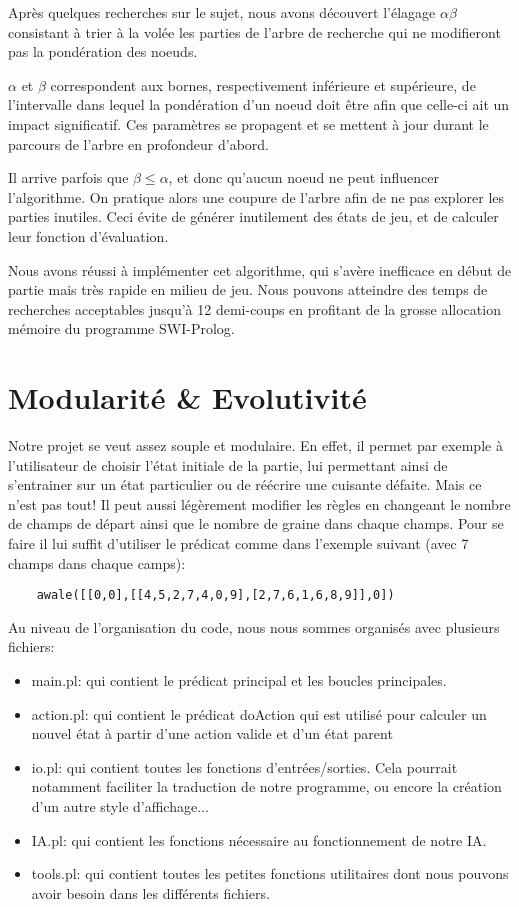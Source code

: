 \documentclass[]{article}
\begin{document}
Après quelques recherches sur le sujet, nous avons découvert l'élagage $\alpha\beta$ consistant à trier à la volée les parties de l'arbre de recherche qui ne modifieront pas la pondération des noeuds.

$\alpha$ et $\beta$ correspondent aux bornes, respectivement inférieure et supérieure, de l'intervalle dans lequel la pondération d'un noeud doit être afin que celle-ci ait un impact significatif. Ces paramètres se propagent et se mettent à jour durant le parcours de l'arbre en profondeur d'abord.

Il arrive parfois que $\beta \leq \alpha$, et donc qu'aucun noeud ne peut influencer l'algorithme. On pratique alors une coupure de l'arbre afin de ne pas explorer les parties inutiles. Ceci évite de générer inutilement des états de jeu, et de calculer leur fonction d'évaluation.

Nous avons réussi à implémenter cet algorithme, qui s'avère inefficace en début de partie mais très rapide en milieu de jeu. Nous pouvons atteindre des temps de recherches acceptables jusqu'à 12 demi-coups en profitant de la grosse allocation mémoire du programme SWI-Prolog.


\section{Modularité \& Evolutivité}

Notre projet se veut assez souple et modulaire. En effet, il permet par exemple à l'utilisateur de choisir l'état initiale de la partie, lui permettant ainsi de s'entrainer sur un état particulier ou de réécrire une cuisante défaite.
Mais ce n'est pas tout! Il peut aussi légèrement modifier les règles en changeant le nombre de champs de départ ainsi que le nombre de graine dans chaque champs. Pour se faire il lui suffit d'utiliser le prédicat comme dans l'exemple suivant (avec 7 champs dans chaque camps):

\begin{verbatim}
	awale([[0,0],[[4,5,2,7,4,0,9],[2,7,6,1,6,8,9]],0])
\end{verbatim}

	
Au niveau de l'organisation du code, nous nous sommes organisés avec plusieurs fichiers:
\begin{itemize}
\item main.pl:		qui contient le prédicat principal et les boucles principales.
\item action.pl:		qui contient le prédicat doAction qui est utilisé pour calculer un nouvel état à partir d'une action valide et d'un état parent
\item io.pl:			qui contient toutes les fonctions d'entrées/sorties. Cela pourrait notamment faciliter la traduction de notre programme, ou encore la création d'un autre style d'affichage...
\item IA.pl:			qui contient les fonctions nécessaire au fonctionnement de notre IA.
\item tools.pl:		qui contient toutes les petites fonctions utilitaires dont nous pouvons avoir besoin dans les différents fichiers.
\end{itemize}
\end{document}
